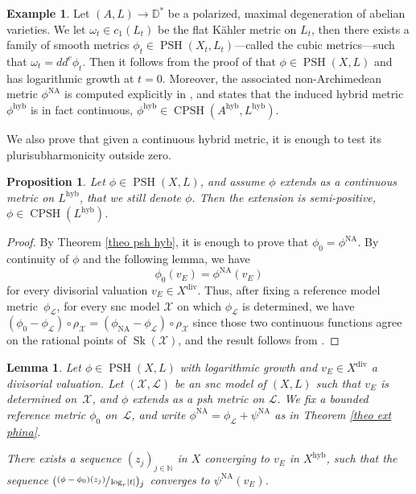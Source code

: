 \documentclass[JEP,XML,SOM,Unicode,published]{cedram}
\newtheorem{prop}[equation]{Proposition}
\newtheorem{lem}[equation]{Lemma}
\theoremstyle{definition}
\newtheorem{ex}[equation]{Example}
\newcommand \D {\mathbb{D}}
\newcommand \N{\mathbb N}
\newcommand \Ld {\mathscr {L}}
\newcommand \X {\mathscr{X}}
\DeclareMathOperator{\CPSH}{CPSH}
\newcommand{\hyb}{\mathrm{hyb}}
\DeclareMathOperator{\NA}{NA}
\DeclareMathOperator{\PSH}{PSH}
\DeclareMathOperator{\Sk}{Sk}
\DeclareMathOperator{\xdiv}{div}
\begin{document}
\begin{ex} Let $(A, L) \to \D^*$ be a polarized, maximal degeneration of abelian varieties. We let $\omega_t \in c_1(L_t)$ be the flat Kähler metric on $L_t$, then there exists a family of smooth metrics $\phi_t \in \PSH(X_t, L_t)$---called the cubic metrics---such that $\omega_t = dd^c \phi_t$. Then it follows from the proof of \cite[Th.\,4.13]{GO} that $\phi \in \PSH(X, L)$ and has logarithmic growth at $t=0$. Moreover, the associated non-Archimedean metric $\phi^{\NA}$ is computed explicitly in \cite[Th.\,4.3]{Liu}, and \cite[Th.\,4.13]{GO} states that the induced hybrid metric $\phi^{\hyb}$ is in fact continuous, \ie $\phi^{\hyb} \in \CPSH(A^{\hyb}, L^{\hyb})$.
\end{ex}
We also prove that given a continuous hybrid metric, it is enough to test its plurisubharmonicity outside zero.
\begin{prop} \label{prop psh cont} Let $\phi \in \PSH(X, L)$, and assume $\phi$ extends as a continuous metric on $L^{\hyb}$, that we still denote $\phi$. Then the extension is semi-positive, \ie $\phi \in \CPSH(L^{\hyb})$.
\end{prop}
\begin{proof} By Theorem \ref{theo psh hyb}, it is enough to prove that $\phi_0 = \phi^{\NA}$. By continuity of $\phi$ and the following lemma, we have
\[
\phi_0(v_E) = \phi^{\NA}(v_E)
\]
for every divisorial valuation $v_E \in X^{\xdiv}$. Thus, after fixing a reference model metric~$\phi_{\Ld}$, for every snc model $\X$ on which $\phi_{\Ld}$ is determined, we have $(\phi_0 - \phi_{\Ld}) \circ \rho_{\X} = (\phi_{\NA} - \phi_{\Ld}) \circ \rho_{\X}$ since those two continuous functions agree on the rational points of $\Sk(\X)$, and the result follows from \cite[Prop.\,7.6]{BFJ2}.
\end{proof}
\begin{lem} Let $\phi \in \PSH(X, L)$ with logarithmic growth and $v_E \in X^{\xdiv}$ a divisorial valuation. Let $(\X, \Ld)$ be an snc model of $(X, L)$ such that $v_E$ is determined on~$\X$, and $\phi$ extends as a psh metric on $\Ld$. We fix a bounded reference metric $\phi_0$ on~$\Ld$, and write $\phi^{\NA} = \phi_{\Ld} + \psi^{\NA}$ as in Theorem \ref{theo ext phina}.

There exists a sequence $(z_j)_{j \in \N}$ in $X$ converging to $v_E$ in $X^{\hyb}$, such that the sequence $(\sfrac{(\phi-\phi_{0})(z_j)}{\log_r \lvert t \rvert})_j$ converges to $\psi^{\NA}(v_E)$.
\end{lem}
\end{document}
